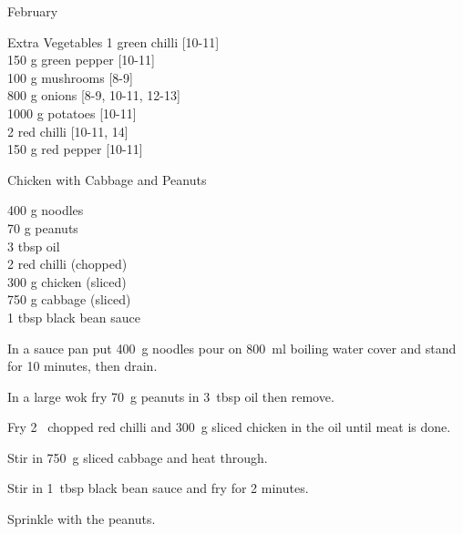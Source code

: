 \begin{menu}{February}
\begin{shoppinglist}{Extra Vegetables}
      1  green chilli 
        {\scriptsize[10-11]}\\
      150 g green pepper 
        {\scriptsize[10-11]}\\
      100 g mushrooms 
        {\scriptsize[8-9]}\\
      800 g onions 
        {\scriptsize[8-9, 10-11, 12-13]}\\
      1000 g potatoes 
        {\scriptsize[10-11]}\\
      2  red chilli 
        {\scriptsize[10-11, 14]}\\
      150 g red pepper 
        {\scriptsize[10-11]}\\
      \end{shoppinglist}%
      \par\vfil %
    \vfil\clearpage
  
    \begin{recipe}{2}{Chicken with Cabbage and Peanuts}%
		\begin{ingredients}
		400 g noodles  \\
	70 g peanuts  \\
	3 tbsp oil  \\
	2  red chilli (chopped) \\
	300 g chicken (sliced) \\
	750 g cabbage (sliced) \\
	1 tbsp black bean sauce  \\
	
		\end{ingredients}
	
    \begin{instructions}
    \item 
      In a sauce pan
      put
      400~g  noodles
      pour on
      800~ml  boiling water
      cover and stand for 10 minutes, then drain.
    \item 
        In a large wok	fry
        70~g  peanuts
        in
        3~tbsp  oil
        then remove.
      \item 
        Fry 2~ chopped red chilli
        and
        300~g sliced chicken
        in the oil until meat is done.
      \item 
        Stir in
        750~g sliced cabbage
        and heat through.
      \item 
        Stir in
        1~tbsp  black bean sauce
        and fry for 2 minutes.
      \item 
        Sprinkle with the peanuts.
      

\end{instructions}
\end{recipe}
\end{menu}
